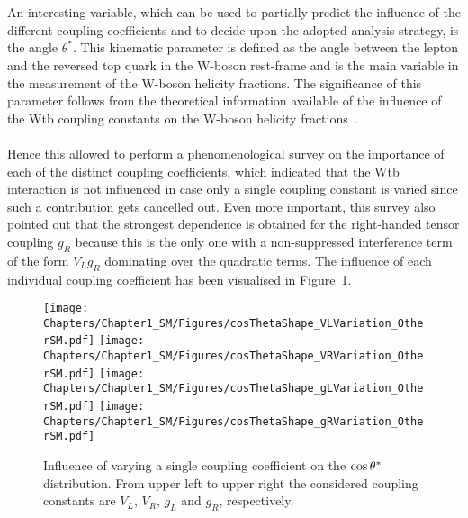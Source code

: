\\
\\
An interesting variable, which can be used to partially predict the influence of the different coupling coefficients and to decide upon the adopted analysis strategy, is the angle $\theta^{*}$. This kinematic parameter is defined as the angle between the lepton and the reversed top quark in the W-boson rest-frame and is the main variable in the measurement of the W-boson helicity fractions. The significance of this parameter follows from the theoretical information available of the influence of the Wtb coupling constants on the W-boson helicity fractions~\cite{WidthLinkWtb}.
\\
\\
Hence this allowed to perform a phenomenological survey on the importance of each of the distinct coupling coefficients, which indicated that the Wtb interaction is not influenced in case only a single coupling constant is varied since such a contribution gets cancelled out. Even more important, this survey also pointed out that the strongest dependence is obtained for the right-handed tensor coupling $g_R$ because this is the only one with a non-suppressed interference term of the form $V_L g_R$ dominating over the quadratic terms. The influence of each individual coupling coefficient has been visualised in Figure~\ref{fig::CsThInfluence}.
\begin{figure}[h!t]
 \centering
 \texttt{[image: Chapters/Chapter1\_SM/Figures/cosThetaShape\_VLVariation\_OtherSM.pdf]}
 \texttt{[image: Chapters/Chapter1\_SM/Figures/cosThetaShape\_VRVariation\_OtherSM.pdf]}
 \texttt{[image: Chapters/Chapter1\_SM/Figures/cosThetaShape\_gLVariation\_OtherSM.pdf]}
 \texttt{[image: Chapters/Chapter1\_SM/Figures/cosThetaShape\_gRVariation\_OtherSM.pdf]}
 \caption{Influence of varying a single coupling coefficient on the $\cos \theta^{*}$ distribution. From upper left to upper right the considered coupling constants are $V_L$, $V_R$, $g_L$ and $g_R$, respectively.}
 \label{fig::CsThInfluence}
\end{figure}

